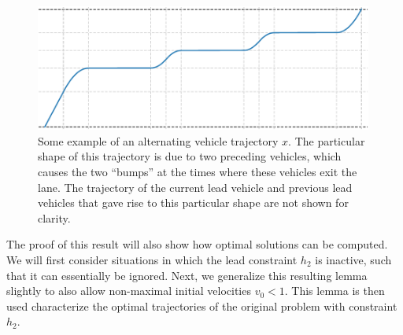 \documentclass[a4paper]{article}
\theoremstyle{definition}
\theoremstyle{plain}
\begin{document}
\begin{figure}
  \centering
  \includegraphics[width=0.99\textwidth]{figures/motion/tandem_trajectory}
  \caption{Some example of an alternating vehicle trajectory $x$. The particular
    shape of this trajectory is due to two preceding vehicles, which causes the
    two ``bumps'' at the times where these vehicles exit the lane. The
    trajectory of the current lead vehicle and previous lead vehicles that gave
    rise to this particular shape are not shown for clarity.}
  \label{fig:tandem_trajectory}
\end{figure}

The proof of this result will also show how optimal solutions can be computed.
We will first consider situations in which the lead constraint $h_{2}$ is
inactive, such that it can essentially be ignored. Next, we generalize this
resulting lemma slightly to also allow non-maximal initial velocities
$v_{0} < 1$. This lemma is then used characterize the optimal trajectories of
the original problem with constraint $h_{2}$.


%
%
\end{document}
